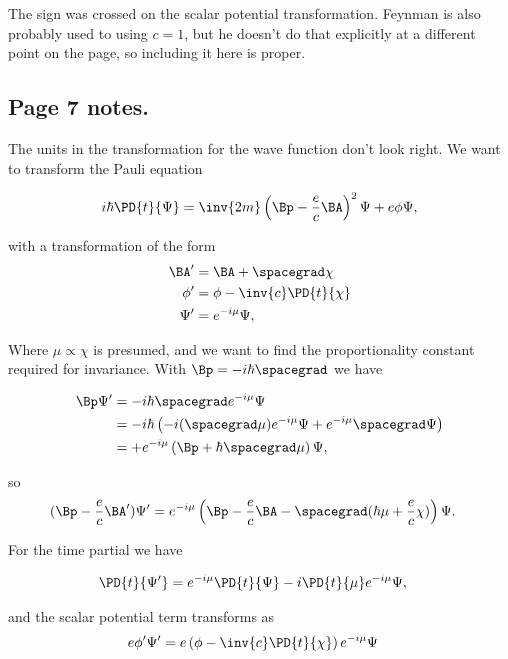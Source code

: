 The sign was crossed on the scalar potential transformation.  Feynman is also probably used to using $c=1$, but he doesn't do that explicitly at a different point on the page, so including it here is proper.

\subsection{Page 7 notes.}

The units in the transformation for the wave function don't look right.  We want to transform the Pauli equation

\begin{align*}
i \hbar \PD{t}{\Psi} = \inv{2 m} \left( \Bp - \frac{e}{c} \BA \right)^2 \Psi + e \phi \Psi,
\end{align*}

with a transformation of the form
\begin{align*}
\BA' &= \BA + \spacegrad \chi \\
\phi' &= \phi - \inv{c} \PD{t}{\chi} \\
\Psi' &= e^{-i \mu} \Psi,
\end{align*}

Where $\mu \propto \chi$ is presumed, and we want to find the proportionality constant required for invariance.  With $\Bp = - i \hbar \spacegrad$ we have

\begin{align*}
\Bp \Psi' 
&=
-i \hbar \spacegrad e^{-i \mu} \Psi \\
&=
-i \hbar \left( 
-i (\spacegrad \mu) e^{-i \mu} \Psi 
+ e^{-i \mu} \spacegrad \Psi  
\right) \\
&=
+ e^{-i \mu} \left( \Bp + \hbar \spacegrad \mu \right) \Psi,
\end{align*}

so
\begin{align*}
(\Bp -\frac{e}{c} \BA' )\Psi' 
&=
e^{-i \mu} \left( \Bp - \frac{e}{c} \BA - \spacegrad (\hbar \mu + \frac{e}{c} \chi) \right) \Psi.
\end{align*}

For the time partial we have

\begin{align*}
\PD{t}{\Psi'} &= e^{-i \mu} \PD{t}{\Psi} -i \PD{t}{\mu} e^{-i \mu} \Psi,
\end{align*}

and the scalar potential term transforms as
\begin{align*}
e \phi' \Psi'
&=
e \left( \phi - \inv{c} \PD{t}{\chi} \right) e^{-i \mu } \Psi
\end{align*}

